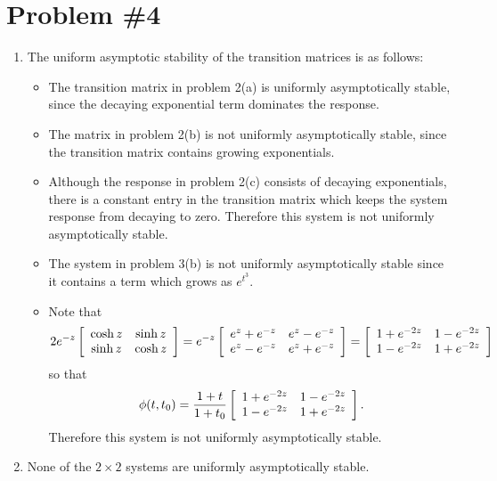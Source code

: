 \documentclass{article}
\begin{document}
\section*{Problem \#4}

\begin{enumerate}
  \item{
    The uniform asymptotic stability of the transition matrices is as
    follows:
    \begin{itemize}
      \item{
        The transition matrix in problem 2(a) is uniformly
        asymptotically stable, since the decaying exponential term
        dominates the response.
      }
      \item{
        The matrix in problem 2(b) is not uniformly asymptotically
        stable, since the transition matrix contains growing
        exponentials.
      }
      \item{
        Although the response in problem 2(c) consists of decaying
        exponentials, there is a constant entry in the transition
        matrix which keeps the system response from decaying to
        zero. Therefore this system is not uniformly asymptotically
        stable.
      }
      \item{
        The system in problem 3(b) is not uniformly asymptotically
        stable since it contains a term which grows as $e^{t^3}$.
      }
      \item{
        Note that
        $$
        2e^{-z}
        \left[\begin{array}{c c}
          \cosh z & \sinh z \\
          \sinh z & \cosh z
        \end{array}\right]
        =
        e^{-z}
        \left[\begin{array}{c c}
          e^{z} + e^{-z} & e^{z} - e^{-z} \\
          e^{z} - e^{-z} & e^{z} + e^{-z}
        \end{array}\right]
        =
        \left[\begin{array}{c c}
          1 + e^{-2z} & 1 - e^{-2z} \\
          1 - e^{-2z} & 1 + e^{-2z}
        \end{array}\right]
        $$
        so that
        $$
        \phi(t, t_0) =
        \frac{1 + t}{1 + t_0}
        \left[\begin{array}{c c}
          1 + e^{-2z} & 1 - e^{-2z} \\
          1 - e^{-2z} & 1 + e^{-2z}
        \end{array}\right].
        $$
        Therefore this system is not uniformly asymptotically stable.
      }
    \end{itemize}
  }
  \item{
    None of the $2 \times 2$ systems are uniformly asymptotically stable.
  }
\end{enumerate}
\end{document}
